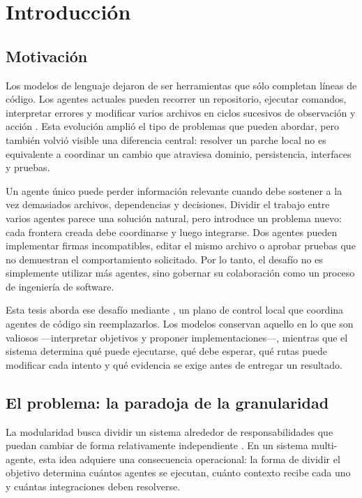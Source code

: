 \chapter{Introducción}
\label{cap:introduccion}

\section{Motivación}

Los modelos de lenguaje dejaron de ser herramientas que sólo completan líneas
de código. Los agentes actuales pueden recorrer un repositorio, ejecutar
comandos, interpretar errores y modificar varios archivos en ciclos sucesivos
de observación y acción \cite{chen2021codex,yao2023react,yang2024sweagent}. Esta
evolución amplió el tipo de problemas que pueden abordar, pero también volvió
visible una diferencia central: resolver un parche local no es equivalente a
coordinar un cambio que atraviesa dominio, persistencia, interfaces y pruebas.

Un agente único puede perder información relevante cuando debe sostener a la
vez demasiados archivos, dependencias y decisiones. Dividir el trabajo entre
varios agentes parece una solución natural, pero introduce un problema nuevo:
cada frontera creada debe coordinarse y luego integrarse. Dos agentes pueden
implementar firmas incompatibles, editar el mismo archivo o aprobar pruebas que
no demuestran el comportamiento solicitado. Por lo tanto, el desafío no es
simplemente utilizar más agentes, sino gobernar su colaboración como un proceso
de ingeniería de software.

Esta tesis aborda ese desafío mediante \sistema, un plano de control local que
coordina agentes de código sin reemplazarlos. Los modelos conservan aquello en
lo que son valiosos —interpretar objetivos y proponer implementaciones—,
mientras que el sistema determina qué puede ejecutarse, qué debe esperar, qué
rutas puede modificar cada intento y qué evidencia se exige antes de entregar
un resultado.

\section{El problema: la paradoja de la granularidad}

La modularidad busca dividir un sistema alrededor de responsabilidades que
puedan cambiar de forma relativamente independiente \cite{parnas1972criteria}.
En un sistema multi-agente, esta idea adquiere una consecuencia operacional:
la forma de dividir el objetivo determina cuántos agentes se ejecutan, cuánto
contexto recibe cada uno y cuántas integraciones deben resolverse.

